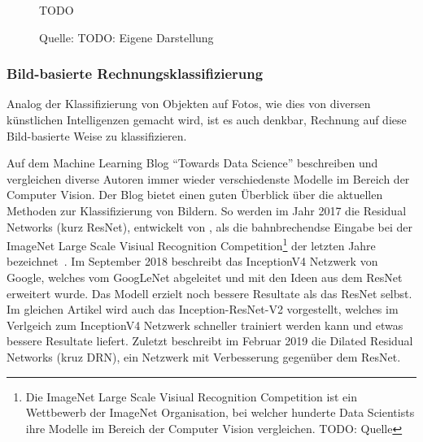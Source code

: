 \begin{figure}[h]
    \captionsetup{width=.8\linewidth}
    \caption{TODO}
    \label{class-distribution}
    \centering
    \caption*{Quelle: TODO: Eigene Darstellung}
\end{figure}

\subsubsection{Bild-basierte Rechnungsklassifizierung}


Analog der Klassifizierung von Objekten auf Fotos, wie dies von diversen künstlichen Intelligenzen gemacht wird, ist es auch denkbar, Rechnung auf diese Bild-basierte Weise zu klassifizieren.

Auf dem Machine Learning Blog \enquote{Towards Data Science} beschreiben und vergleichen diverse Autoren immer wieder verschiedenste Modelle im Bereich der Computer Vision. Der Blog bietet einen guten Überblick über die aktuellen Methoden zur Klassifizierung von Bildern. So werden im Jahr 2017 die Residual Networks (kurz ResNet), entwickelt von \textcite{He2015}, als die bahnbrechendse Eingabe bei der ImageNet Large Scale Visiual Recognition Competition\footnote{Die ImageNet Large Scale Visiual Recognition Competition ist ein Wettbewerb der ImageNet Organisation, bei welcher hunderte Data Scientists ihre Modelle im Bereich der Computer Vision vergleichen. TODO: Quelle} der letzten Jahre bezeichnet~\autocite{Fungg2017ResNet}. Im September 2018 beschreibt \textcite{SHTsuang2018Inception} das InceptionV4 Netzwerk von Google, welches vom GoogLeNet abgeleitet und mit den Ideen aus dem ResNet erweitert wurde. Das Modell erzielt noch bessere Resultate als das ResNet selbst. Im gleichen Artikel wird auch das Inception-ResNet-V2 vorgestellt, welches im Verlgeich zum InceptionV4 Netzwerk schneller trainiert werden kann und etwas bessere Resultate liefert. Zuletzt beschreibt \textcite{SHTsuang2019DR} im Februar 2019 die Dilated Residual Networks (kruz DRN), ein Netzwerk mit Verbesserung gegenüber dem ResNet.

